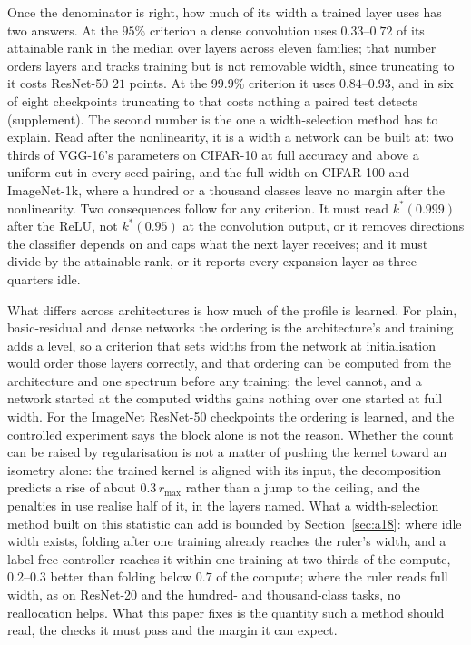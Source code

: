 \documentclass[10pt,journal,compsoc]{IEEEtran}
\begin{document}
Once the denominator is right, how much of its width a trained layer uses
has two answers. At the $95\%$ criterion a dense convolution uses
$0.33$--$0.72$ of its attainable rank in the median over layers across
eleven families; that number orders layers and tracks training but is not
removable width, since truncating to it costs ResNet-50 $21$ points. At
the $99.9\%$ criterion it uses $0.84$--$0.93$, and in six of eight
checkpoints truncating to that costs nothing a paired test detects
(supplement). The
second number is the one a width-selection method has to explain. Read
after the nonlinearity, it is
a width a network can be built at: two thirds of VGG-16's parameters on
CIFAR-10 at full accuracy and above a uniform cut in every seed pairing,
and the full width on CIFAR-100 and ImageNet-1k, where a hundred or a
thousand classes leave no margin after the nonlinearity. Two consequences
follow for any criterion. It must read $k^*(0.999)$ after the ReLU, not
$k^*(0.95)$ at the convolution output, or it removes directions the
classifier depends on and caps what the next layer receives; and it must
divide by the attainable rank, or it reports every expansion layer as
three-quarters idle.

What differs across architectures is how much of the profile is learned.
For plain, basic-residual and dense networks the ordering is the
architecture's and training adds a level, so a criterion that sets widths
from the network at initialisation would order those layers correctly,
and that ordering can be computed from the architecture and one spectrum
before any training; the level cannot, and a network started at the
computed widths gains nothing over one started at full width. For the
ImageNet ResNet-50 checkpoints the ordering is learned, and the controlled
experiment says the block alone is not the reason.
Whether the count can be raised by regularisation is not a matter of
pushing the kernel toward an isometry alone: the trained kernel is aligned
with its input, the decomposition predicts a rise of about $0.3\,r_{\max}$
rather than a jump to the ceiling, and the penalties in use realise half
of it, in the layers named. What a width-selection method built on this statistic can add is
bounded by Section~\ref{sec:a18}: where idle width exists, folding after
one training already reaches the ruler's width, and a label-free
controller reaches it within one training at two thirds of the compute,
$0.2$--$0.3$ better than folding below $0.7$ of the compute; where the
ruler reads full width, as on ResNet-20 and the hundred- and
thousand-class tasks, no reallocation helps. What this paper fixes is the
quantity such a method should read, the checks it must pass and the
margin it can expect.
\end{document}
